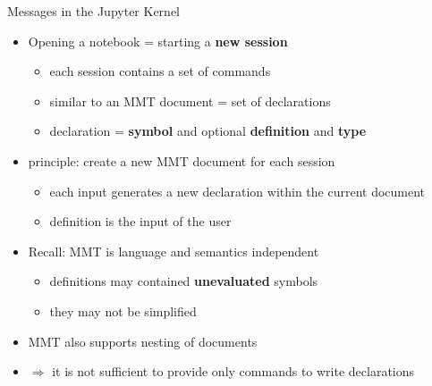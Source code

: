 \documentclass{beamer}
\begin{document}
     \begin{frame}{Messages in the Jupyter Kernel}
        \begin{itemize}
            \item Opening a notebook = starting a \textbf{new session}
            \begin{itemize}
                \item each session contains a set of commands
                \item similar to an MMT document = set of declarations
                \item declaration = \textbf{symbol} and optional \textbf{definition} and \textbf{type}
            \end{itemize}
            \item principle: create a new MMT document for each session
            \begin{itemize}
                \item each input generates a new declaration within the current document
                \item definition is the input of the user
            \end{itemize}
            \item Recall: MMT is language and semantics independent
            \begin{itemize}
                \item definitions may contained \textbf{unevaluated} symbols
                \item they may not be simplified
            \end{itemize}
            \item MMT also supports nesting of documents
            \item $\Rightarrow$ it is not sufficient to provide only commands to write declarations
        \end{itemize}
    \end{frame}
\end{document}

